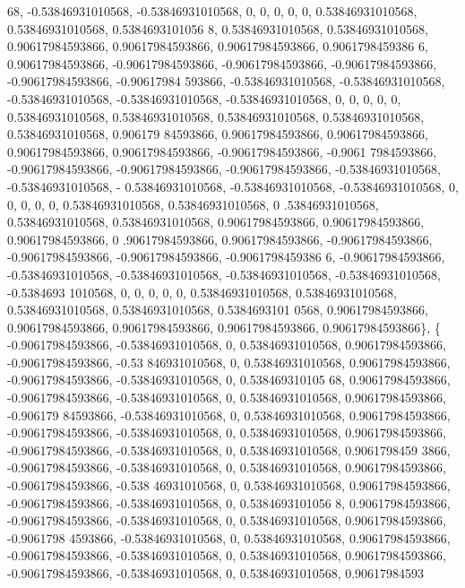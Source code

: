 \begin{DoxyCode}
      68, -0.53846931010568, -0.53846931010568, 0, 0, 0, 0, 0, 0.53846931010568, 0.53846931010568, 0.5384693101056
      8, 0.53846931010568, 0.53846931010568, 0.90617984593866, 0.90617984593866, 0.90617984593866, 0.9061798459386
      6, 0.90617984593866, -0.90617984593866, -0.90617984593866, -0.90617984593866, -0.90617984593866, -0.90617984
      593866, -0.53846931010568, -0.53846931010568, -0.53846931010568, -0.53846931010568, -0.53846931010568, 0, 0,
       0, 0, 0, 0.53846931010568, 0.53846931010568, 0.53846931010568, 0.53846931010568, 0.53846931010568, 0.906179
      84593866, 0.90617984593866, 0.90617984593866, 0.90617984593866, 0.90617984593866, -0.90617984593866, -0.9061
      7984593866, -0.90617984593866, -0.90617984593866, -0.90617984593866, -0.53846931010568, -0.53846931010568, -
      0.53846931010568, -0.53846931010568, -0.53846931010568, 0, 0, 0, 0, 0, 0.53846931010568, 0.53846931010568, 0
      .53846931010568, 0.53846931010568, 0.53846931010568, 0.90617984593866, 0.90617984593866, 0.90617984593866, 0
      .90617984593866, 0.90617984593866, -0.90617984593866, -0.90617984593866, -0.90617984593866, -0.9061798459386
      6, -0.90617984593866, -0.53846931010568, -0.53846931010568, -0.53846931010568, -0.53846931010568, -0.5384693
      1010568, 0, 0, 0, 0, 0, 0.53846931010568, 0.53846931010568, 0.53846931010568, 0.53846931010568, 0.5384693101
      0568, 0.90617984593866, 0.90617984593866, 0.90617984593866, 0.90617984593866, 0.90617984593866\},
    \{ -0.90617984593866, -0.53846931010568, 0, 0.53846931010568, 0.90617984593866, -0.90617984593866, -0.53
      846931010568, 0, 0.53846931010568, 0.90617984593866, -0.90617984593866, -0.53846931010568, 0, 0.538469310105
      68, 0.90617984593866, -0.90617984593866, -0.53846931010568, 0, 0.53846931010568, 0.90617984593866, -0.906179
      84593866, -0.53846931010568, 0, 0.53846931010568, 0.90617984593866, -0.90617984593866, -0.53846931010568, 0,
       0.53846931010568, 0.90617984593866, -0.90617984593866, -0.53846931010568, 0, 0.53846931010568, 0.9061798459
      3866, -0.90617984593866, -0.53846931010568, 0, 0.53846931010568, 0.90617984593866, -0.90617984593866, -0.538
      46931010568, 0, 0.53846931010568, 0.90617984593866, -0.90617984593866, -0.53846931010568, 0, 0.5384693101056
      8, 0.90617984593866, -0.90617984593866, -0.53846931010568, 0, 0.53846931010568, 0.90617984593866, -0.9061798
      4593866, -0.53846931010568, 0, 0.53846931010568, 0.90617984593866, -0.90617984593866, -0.53846931010568, 0, 
      0.53846931010568, 0.90617984593866, -0.90617984593866, -0.53846931010568, 0, 0.53846931010568, 0.90617984593

\end{DoxyCode}
